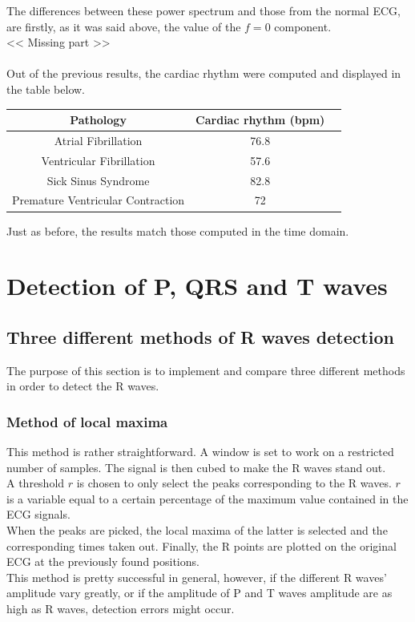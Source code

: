 \documentclass[11pt]{article}
\begin{document}
		The differences between these power spectrum and those from the normal ECG, are firstly, as it was said above, the value of the $f=0$ component.\\
		<< Missing part >>
		\\
		\\
		Out of the previous results, the cardiac rhythm were computed and displayed in the table below. 
		\begin{center}
			\begin{tabular}{|c|c|c|}
				\hline
				\textbf{Pathology} & \textbf{Cardiac rhythm (bpm)} \\
				\hline
				Atrial Fibrillation & 76.8 \\ 
				\hline
				Ventricular Fibrillation & 57.6 \\
				\hline
				Sick Sinus Syndrome & 82.8 \\
				\hline
				Premature Ventricular Contraction & 72 \\
				\hline
			\end{tabular}
		\end{center}
		Just as before, the results match those computed in the time domain.



\section{Detection of P, QRS and T waves}
	\subsection{Three different methods of R waves detection}
		The purpose of this section is to implement and compare three different methods in order to detect the R waves.
		\subsubsection{Method of local maxima}
			This method is rather straightforward. A window is set to work on a restricted number of samples. The signal is then cubed to make the R waves stand out.\\
			A threshold $r$ is chosen to only select the peaks corresponding to the R waves. $r$ is a variable equal to a certain percentage of the maximum value contained in the ECG signals.\\
			When the peaks are picked, the local maxima of the latter is selected and the corresponding times taken out. Finally, the R points are plotted on the original ECG at the previously found positions.\\
			This method is pretty successful in general, however, if the different R waves' amplitude vary greatly, or if the amplitude of P and T waves amplitude are as high as R waves,  detection errors might occur.
\end{document}
